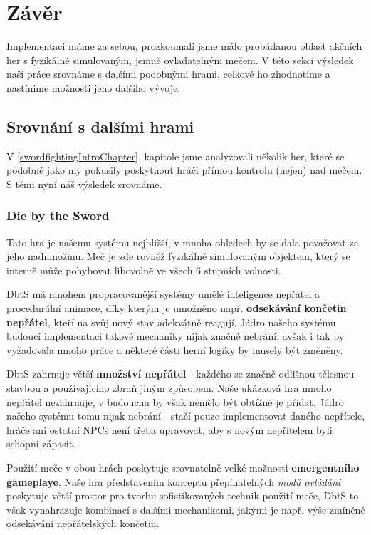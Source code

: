 \chapter{Závěr}

Implementaci máme za sebou, prozkoumali jsme málo probádanou oblast akčních her s fyzikálně simulovaným, jemně ovladatelným mečem. V této sekci výsledek naší práce srovnáme s dalšími podobnými hrami, celkově ho zhodnotíme a nastínime možnosti jeho dalšího vývoje. 

\section{Srovnání s dalšími hrami}

V \ref{swordfightingIntroChapter}. kapitole jsme analyzovali několik her, které se podobně jako my pokusily poskytnout hráči přímou kontrolu (nejen) nad mečem. S těmi nyní náš výsledek srovnáme.

\subsection{Die by the Sword}

Tato hra je našemu systému nejbližší, v mnoha ohledech by se dala považovat za jeho nadmnožinu. Meč je zde rovněž fyzikálně simulovaným objektem, který se interně může pohybovat libovolně ve všech 6 stupních volnosti. 

\acl{DbtS} má mnohem propracovanější systémy umělé inteligence nepřátel a procedurální animace, díky kterým je umožněno např. \textbf{odsekávání končetin nepřátel}, kteří na svůj nový stav adekvátně reagují. Jádro našeho systému budoucí implementaci takové mechaniky nijak značně nebrání, avšak i tak by vyžadovala mnoho práce a některé části herní logiky by musely být změněny. 

\acl{DbtS} zahrnuje větší \textbf{množství nepřátel} - každého se značně odlišnou tělesnou stavbou a používajícího zbraň jiným způsobem. Naše ukázková hra mnoho nepřátel nezahrnuje, v budoucnu by však nemělo být obtížné je přidat. Jádro našeho systému tomu nijak nebrání - stačí pouze implementovat daného nepřítele, hráče ani ostatní \acs{NPC}s není třeba upravovat, aby s novým nepřítelem byli schopni zápasit.  

Použití meče v obou hrách poskytuje srovnatelně velké možnosti \textbf{emergentního gameplaye}. Naše hra představením konceptu přepínatelných \textit{modů ovládání} poskytuje větší prostor pro tvorbu sofistikovaných technik použití meče, \acl{DbtS} to však vynahrazuje kombinací s dalšími mechanikami, jakými je např. výše zmíněné odsekávání nepřátelských končetin. 

